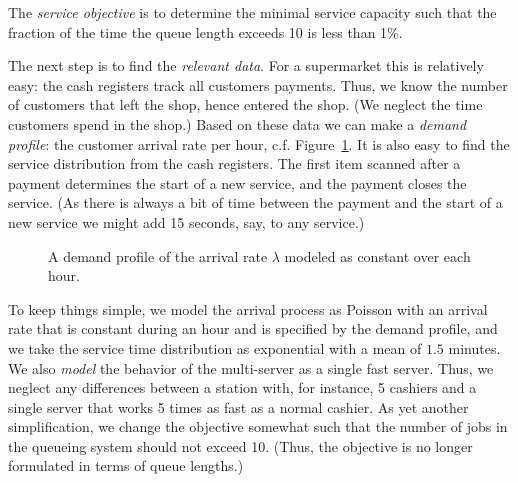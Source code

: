 The \emph{service objective} is to determine the minimal service
capacity such that the fraction of the time the queue length exceeds
10 is less than 1\%.

The next step is to find the \emph{relevant data}. For a supermarket
this is relatively easy: the cash registers track all customers
payments. Thus, we know the number of customers that left the shop,
hence entered the shop. (We neglect the time customers spend in the
shop.) Based on these data we can make a \emph{demand profile}: the
customer arrival rate per hour, c.f. Figure~\ref{fig:loadprofile}. It
is also easy to find the service distribution from the cash
registers. The first item scanned after a payment determines the start
of a new service, and the payment closes the service. (As there is
always a bit of time between the payment and the start of a new
service we might add 15 seconds, say, to any service.)

\begin{figure}[t]
  \centering
{}
  \caption{A  demand profile of the arrival rate $\lambda$ modeled as constant over each hour.}
  \label{fig:loadprofile}
\end{figure}

To keep things simple, we model the arrival process as Poisson with an
arrival rate that is constant during an hour and is specified by the
demand profile, and we take the service time distribution as
exponential with a mean of $1.5$ minutes. We also \emph{model} the
behavior of the multi-server as a single fast server. Thus, we neglect
any differences between a station with, for instance, 5 cashiers and a
single server that works 5 times as fast as a normal cashier.  As yet
another simplification, we change the objective somewhat such that the
number of jobs in the queueing system should not exceed 10. (Thus, the
objective is no longer formulated in terms of queue lengths.)

